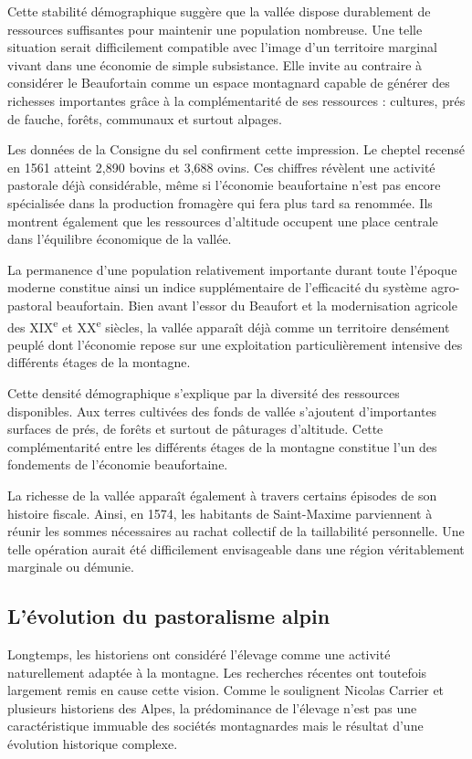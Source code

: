 \documentclass[12pt,a4paper]{report}
\begin{document}
Cette stabilité démographique suggère que la vallée dispose durablement de ressources suffisantes pour maintenir une population nombreuse. Une telle situation serait difficilement compatible avec l'image d'un territoire marginal vivant dans une économie de simple subsistance. Elle invite au contraire à considérer le Beaufortain comme un espace montagnard capable de générer des richesses importantes grâce à la complémentarité de ses ressources : cultures, prés de fauche, forêts, communaux et surtout alpages.

Les données de la Consigne du sel confirment cette impression. Le cheptel recensé en 1561 atteint 2,890 bovins et 3,688 ovins. Ces chiffres révèlent une activité pastorale déjà considérable, même si l'économie beaufortaine n'est pas encore spécialisée dans la production fromagère qui fera plus tard sa renommée. Ils montrent également que les ressources d'altitude occupent une place centrale dans l'équilibre économique de la vallée.

La permanence d'une population relativement importante durant toute l'époque moderne constitue ainsi un indice supplémentaire de l'efficacité du système agro-pastoral beaufortain. Bien avant l'essor du Beaufort et la modernisation agricole des XIX\textsuperscript{e} et XX\textsuperscript{e} siècles, la vallée apparaît déjà comme un territoire densément peuplé dont l'économie repose sur une exploitation particulièrement intensive des différents étages de la montagne.


Cette densité démographique s'explique par la diversité des ressources disponibles. Aux terres cultivées des fonds de vallée s'ajoutent d'importantes surfaces de prés, de forêts et surtout de pâturages d'altitude. Cette complémentarité entre les différents étages de la montagne constitue l'un des fondements de l'économie beaufortaine.

La richesse de la vallée apparaît également à travers certains épisodes de son histoire fiscale. Ainsi, en 1574, les habitants de Saint-Maxime parviennent à réunir les sommes nécessaires au rachat collectif de la taillabilité personnelle. Une telle opération aurait été difficilement envisageable dans une région véritablement marginale ou démunie.

\subsection{L'évolution du pastoralisme alpin}

Longtemps, les historiens ont considéré l'élevage comme une activité naturellement adaptée à la montagne. Les recherches récentes ont toutefois largement remis en cause cette vision. Comme le soulignent Nicolas Carrier et plusieurs historiens des Alpes, la prédominance de l'élevage n'est pas une caractéristique immuable des sociétés montagnardes mais le résultat d'une évolution historique complexe.
\end{document}
